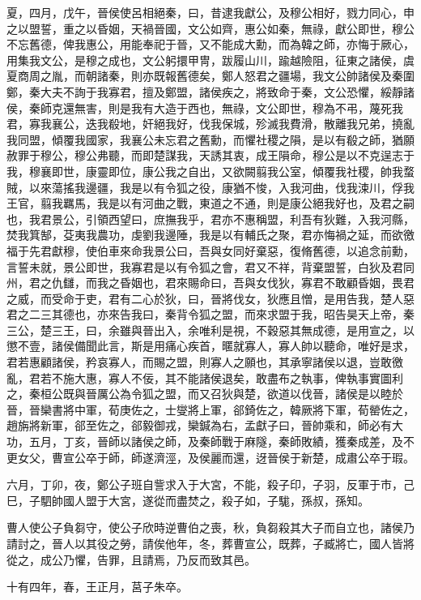 \begin{pinyinscope}
夏，四月，戊午，晉侯使呂相絕秦，曰，昔逮我獻公，及穆公相好，戮力同心，申之以盟誓，重之以昏姻，天禍晉國，文公如齊，惠公如秦，無祿，獻公即世，穆公不忘舊德，俾我惠公，用能奉祀于晉，又不能成大勳，而為韓之師，亦悔于厥心，用集我文公，是穆之成也，文公躬擐甲冑，跋履山川，踰越險阻，征東之諸侯，虞夏商周之胤，而朝諸秦，則亦既報舊德矣，鄭人怒君之疆場，我文公帥諸侯及秦圍鄭，秦大夫不詢于我寡君，擅及鄭盟，諸侯疾之，將致命于秦，文公恐懼，綏靜諸侯，秦師克還無害，則是我有大造于西也，無祿，文公即世，穆為不弔，蔑死我君，寡我襄公，迭我殽地，奸絕我好，伐我保城，殄滅我費滑，散離我兄弟，撓亂我同盟，傾覆我國家，我襄公未忘君之舊勳，而懼社稷之隕，是以有殽之師，猶願赦罪于穆公，穆公弗聽，而即楚謀我，天誘其衷，成王隕命，穆公是以不克逞志于我，穆襄即世，康靈即位，康公我之自出，又欲闕翦我公室，傾覆我社稷，帥我蝥賊，以來蕩搖我邊疆，我是以有令狐之役，康猶不悛，入我河曲，伐我涑川，俘我王官，翦我羈馬，我是以有河曲之戰，東道之不通，則是康公絕我好也，及君之嗣也，我君景公，引領西望曰，庶撫我乎，君亦不惠稱盟，利吾有狄難，入我河縣，焚我箕郜，芟夷我農功，虔劉我邊陲，我是以有輔氏之聚，君亦悔禍之延，而欲徼福于先君獻穆，使伯車來命我景公曰，吾與女同好棄惡，復脩舊德，以追念前勳，言誓未就，景公即世，我寡君是以有令狐之會，君又不祥，背棄盟誓，白狄及君同州，君之仇讎，而我之昏姻也，君來賜命曰，吾與女伐狄，寡君不敢顧昏姻，畏君之威，而受命于吏，君有二心於狄，曰，晉將伐女，狄應且憎，是用告我，楚人惡君之二三其德也，亦來告我曰，秦背令狐之盟，而來求盟于我，昭告昊天上帝，秦三公，楚三王，曰，余雖與晉出入，余唯利是視，不穀惡其無成德，是用宣之，以懲不壹，諸侯備聞此言，斯是用痛心疾首，暱就寡人，寡人帥以聽命，唯好是求，君若惠顧諸侯，矜哀寡人，而賜之盟，則寡人之願也，其承寧諸侯以退，豈敢徼亂，君若不施大惠，寡人不佞，其不能諸侯退矣，敢盡布之執事，俾執事實圖利之，秦桓公既與晉厲公為令狐之盟，而又召狄與楚，欲道以伐晉，諸侯是以睦於晉，晉欒書將中軍，荀庚佐之，士燮將上軍，郤錡佐之，韓厥將下軍，荀罃佐之，趙旃將新軍，郤至佐之，郤毅御戎，欒鍼為右，孟獻子曰，晉帥乘和，師必有大功，五月，丁亥，晉師以諸侯之師，及秦師戰于麻隧，秦師敗績，獲秦成差，及不更女父，曹宣公卒于師，師遂濟涇，及侯麗而還，迓晉侯于新楚，成肅公卒于瑕。

六月，丁卯，夜，鄭公子班自訾求入于大宮，不能，殺子印，子羽，反軍于市，己巳，子駟帥國人盟于大宮，遂從而盡焚之，殺子如，子駹，孫叔，孫知。

曹人使公子負芻守，使公子欣時逆曹伯之喪，秋，負芻殺其大子而自立也，諸侯乃請討之，晉人以其役之勞，請俟他年，冬，葬曹宣公，既葬，子臧將亡，國人皆將從之，成公乃懼，告罪，且請焉，乃反而致其邑。

十有四年，春，王正月，莒子朱卒。


\end{pinyinscope}
